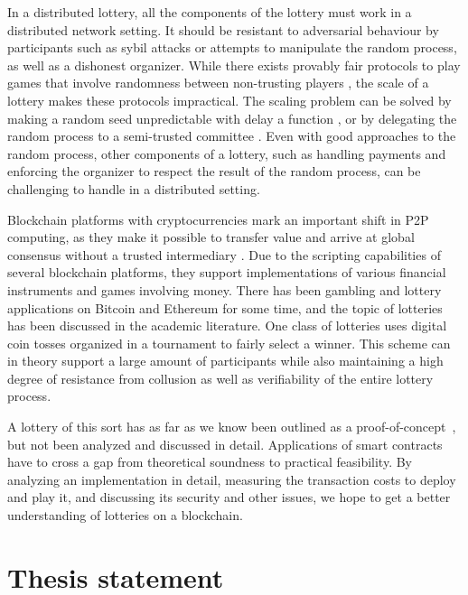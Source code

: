 In a distributed lottery, all the components of the lottery must work in a distributed network setting. It should be resistant to adversarial behaviour by participants such as sybil attacks \cite{douceur2002sybil} or attempts to manipulate the random process, as well as a dishonest organizer. While there exists provably fair protocols to play games that involve randomness between non-trusting players \cite{shamir_mental_1981, blum1983coin, broder_provably_1985, goldreich_how_1987}, the scale of a lottery makes these protocols impractical. The scaling problem can be solved by making a random seed unpredictable with delay a function \cite{goldschlag_publicly_1998}, or by delegating the random process to a semi-trusted committee \cite{fouque_sharing_2001}. Even with good approaches to the random process, other components of a lottery, such as handling payments and enforcing the organizer to respect the result of the random process, can be challenging to handle in a distributed setting. 

Blockchain platforms with cryptocurrencies mark an important shift in P2P computing, as they make it possible to transfer value and arrive at global consensus without a trusted intermediary \cite{crosby_blockchain_2016}. Due to the scripting capabilities of several blockchain platforms, they support implementations of various financial instruments and games involving money. There has been gambling and lottery applications on Bitcoin and Ethereum for some time, and the topic of lotteries has been discussed in the academic literature. One class of lotteries uses digital coin tosses organized in a tournament to fairly select a winner. This scheme can in theory support a large amount of participants while also maintaining a high degree of resistance from collusion as well as verifiability of the entire lottery process.

A lottery of this sort has as far as we know been outlined as a proof-of-concept~\cite{miller_zero-collateral_2017}, but not been analyzed and discussed in detail. Applications of smart contracts have to cross a gap from theoretical soundness to practical feasibility. By analyzing an implementation in detail, measuring the transaction costs to deploy and play it, and discussing its security and other issues, we hope to get a better understanding of lotteries on a blockchain.

\section{Thesis statement}
\label{sec:statement}


